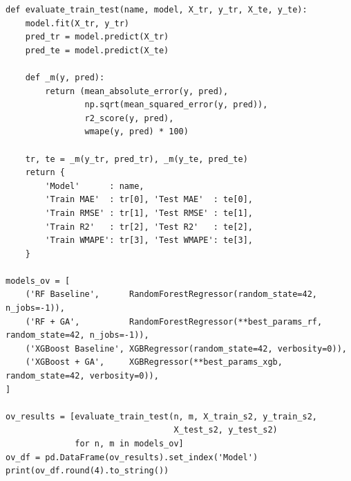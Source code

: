 \begin{lstlisting}[style=pycode,caption={Deteksi overfitting -- perbandingan Train vs Test}]
def evaluate_train_test(name, model, X_tr, y_tr, X_te, y_te):
    model.fit(X_tr, y_tr)
    pred_tr = model.predict(X_tr)
    pred_te = model.predict(X_te)

    def _m(y, pred):
        return (mean_absolute_error(y, pred),
                np.sqrt(mean_squared_error(y, pred)),
                r2_score(y, pred),
                wmape(y, pred) * 100)

    tr, te = _m(y_tr, pred_tr), _m(y_te, pred_te)
    return {
        'Model'      : name,
        'Train MAE'  : tr[0], 'Test MAE'  : te[0],
        'Train RMSE' : tr[1], 'Test RMSE' : te[1],
        'Train R2'   : tr[2], 'Test R2'   : te[2],
        'Train WMAPE': tr[3], 'Test WMAPE': te[3],
    }

models_ov = [
    ('RF Baseline',      RandomForestRegressor(random_state=42, n_jobs=-1)),
    ('RF + GA',          RandomForestRegressor(**best_params_rf, random_state=42, n_jobs=-1)),
    ('XGBoost Baseline', XGBRegressor(random_state=42, verbosity=0)),
    ('XGBoost + GA',     XGBRegressor(**best_params_xgb, random_state=42, verbosity=0)),
]

ov_results = [evaluate_train_test(n, m, X_train_s2, y_train_s2,
                                  X_test_s2, y_test_s2)
              for n, m in models_ov]
ov_df = pd.DataFrame(ov_results).set_index('Model')
print(ov_df.round(4).to_string())
\end{lstlisting}






